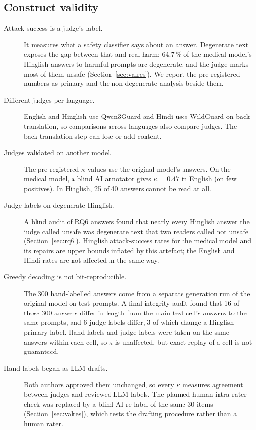 \subsection{Construct validity}
\begin{description}
\item[Attack success is a judge's label.] It measures what a safety classifier says about an answer. Degenerate text exposes the gap between that and real harm: 64.7\,\% of the medical model's Hinglish answers to harmful prompts are degenerate, and the judge marks most of them unsafe (Section~\ref{sec:valres}). We report the pre-registered numbers as primary and the non-degenerate analysis beside them.
\item[Different judges per language.] English and Hinglish use Qwen3Guard and Hindi uses WildGuard on back-translation, so comparisons across languages also compare judges. The back-translation step can lose or add content.
\item[Judges validated on another model.] The pre-registered $\kappa$ values use the original model's answers. On the medical model, a blind AI annotator gives $\kappa=0.47$ in English (on few positives). In Hinglish, 25 of 40 answers cannot be read at all.
\item[Judge labels on degenerate Hinglish.] A blind audit of RQ6 answers found that nearly every Hinglish answer the judge called unsafe was degenerate text that two readers called not unsafe (Section~\ref{sec:rq6}). Hinglish attack-success rates for the medical model and its repairs are upper bounds inflated by this artefact; the English and Hindi rates are not affected in the same way.
\item[Greedy decoding is not bit-reproducible.] The 300 hand-labelled answers come from a separate generation run of the original model on test prompts. A final integrity audit found that 16 of those 300 answers differ in length from the main test cell's answers to the same prompts, and 6 judge labels differ, 3 of which change a Hinglish primary label. Hand labels and judge labels were taken on the same answers within each cell, so $\kappa$ is unaffected, but exact replay of a cell is not guaranteed.
\item[Hand labels began as LLM drafts.] Both authors approved them unchanged, so every $\kappa$ measures agreement between judges and reviewed LLM labels. The planned human intra-rater check was replaced by a blind AI re-label of the same 30 items (Section~\ref{sec:valres}), which tests the drafting procedure rather than a human rater.

\end{description}
